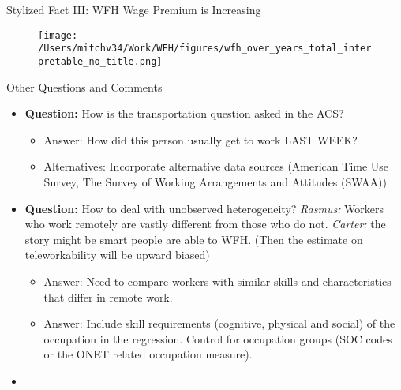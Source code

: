 \documentclass[aspectratio=1610]{beamer}
\begin{document}
\begin{frame}[label=wfhyears_main]{Stylized Fact III: WFH Wage Premium is Increasing}
\begin{figure}[H]
    \centering
    \texttt{[image: /Users/mitchv34/Work/WFH/figures/wfh\_over\_years\_total\_interpretable\_no\_title.png]}
    \label{wfh_over_time}
    \hyperlink{wfhyears_appendix}{}
\end{figure}
\end{frame}

\begin{frame}{Other Questions and Comments}
    \begin{itemize}
        \item[]\textbf{Question:} How is the transportation question asked in the ACS?
        \begin{itemize}
            \item[] \textcolor{myorange}{Answer:} How did this person usually get to work LAST WEEK?
            \item[] \textcolor{mygreen}{Alternatives:} Incorporate alternative data sources (American Time Use Survey, The Survey of Working Arrangements and Attitudes (SWAA))  
        \end{itemize}
        \item[] \textbf{Question:} How to deal with unobserved heterogeneity? \textit{Rasmus:} Workers who work remotely are vastly different from those who do not. \textit{Carter:} the story might be smart people are able to WFH. (Then the estimate on teleworkability will be upward biased)
        \begin{itemize}
            \item[] \textcolor{myorange}{Answer:} Need to compare workers with similar skills and characteristics that differ in remote work.
            \item[] \textcolor{myorange}{Answer:} Include skill requirements (cognitive, physical and social) of the occupation in the regression. Control for occupation groups (SOC codes or the ONET related occupation measure).
        \end{itemize}
        \item[] 
    \end{itemize}
\end{frame}

\end{document}
